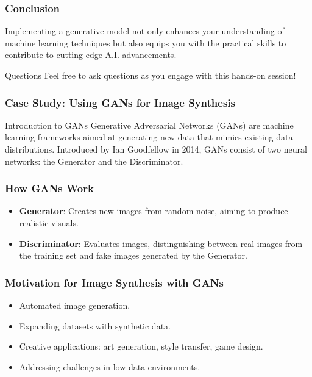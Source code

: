 \documentclass[aspectratio=169]{beamer}
\begin{document}
\begin{frame}
    \frametitle{Conclusion}
    Implementing a generative model not only enhances your understanding of machine learning techniques but also equips you with the practical skills to contribute to cutting-edge A.I. advancements. 

    \begin{block}{Questions}
        Feel free to ask questions as you engage with this hands-on session!
    \end{block}
\end{frame}

\begin{frame}
    \frametitle{Case Study: Using GANs for Image Synthesis}
    \begin{block}{Introduction to GANs}
        Generative Adversarial Networks (GANs) are machine learning frameworks aimed at generating new data that mimics existing data distributions. Introduced by Ian Goodfellow in 2014, GANs consist of two neural networks: the Generator and the Discriminator.
    \end{block}
\end{frame}

\begin{frame}
    \frametitle{How GANs Work}
    \begin{itemize}
        \item \textbf{Generator}: Creates new images from random noise, aiming to produce realistic visuals.
        \item \textbf{Discriminator}: Evaluates images, distinguishing between real images from the training set and fake images generated by the Generator.
    \end{itemize}
\end{frame}

\begin{frame}
    \frametitle{Motivation for Image Synthesis with GANs}
    \begin{itemize}
        \item Automated image generation.
        \item Expanding datasets with synthetic data.
        \item Creative applications: art generation, style transfer, game design.
        \item Addressing challenges in low-data environments.
    \end{itemize}
\end{frame}
\end{document}
